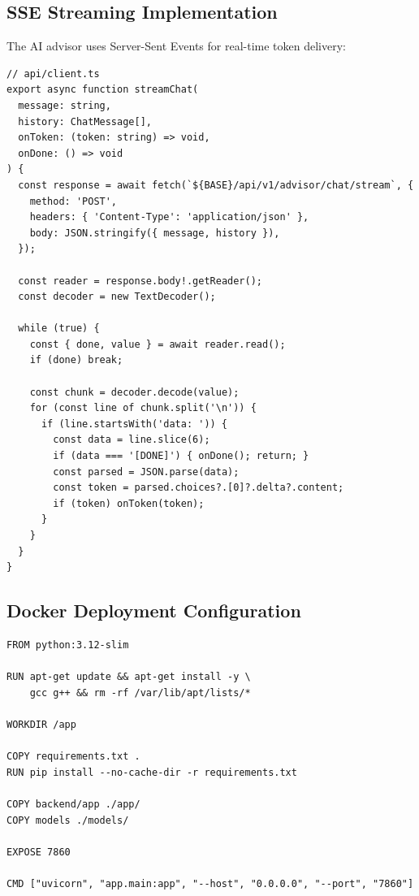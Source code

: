 \documentclass[12pt, a4paper, oneside]{report}
\begin{document}
\subsection{SSE Streaming Implementation}

The AI advisor uses Server-Sent Events for real-time token delivery:

\begin{lstlisting}[style=jsstyle, caption={SSE streaming client implementation (TypeScript)}, label={lst:sse_client}]
// api/client.ts
export async function streamChat(
  message: string,
  history: ChatMessage[],
  onToken: (token: string) => void,
  onDone: () => void
) {
  const response = await fetch(`${BASE}/api/v1/advisor/chat/stream`, {
    method: 'POST',
    headers: { 'Content-Type': 'application/json' },
    body: JSON.stringify({ message, history }),
  });

  const reader = response.body!.getReader();
  const decoder = new TextDecoder();

  while (true) {
    const { done, value } = await reader.read();
    if (done) break;

    const chunk = decoder.decode(value);
    for (const line of chunk.split('\n')) {
      if (line.startsWith('data: ')) {
        const data = line.slice(6);
        if (data === '[DONE]') { onDone(); return; }
        const parsed = JSON.parse(data);
        const token = parsed.choices?.[0]?.delta?.content;
        if (token) onToken(token);
      }
    }
  }
}
\end{lstlisting}

\subsection{Docker Deployment Configuration}

\begin{lstlisting}[style=pythonstyle, caption={Dockerfile for Hugging Face Spaces deployment}, label={lst:dockerfile}, language={}]
FROM python:3.12-slim

RUN apt-get update && apt-get install -y \
    gcc g++ && rm -rf /var/lib/apt/lists/*

WORKDIR /app

COPY requirements.txt .
RUN pip install --no-cache-dir -r requirements.txt

COPY backend/app ./app/
COPY models ./models/

EXPOSE 7860

CMD ["uvicorn", "app.main:app", "--host", "0.0.0.0", "--port", "7860"]
\end{lstlisting}
\end{document}
